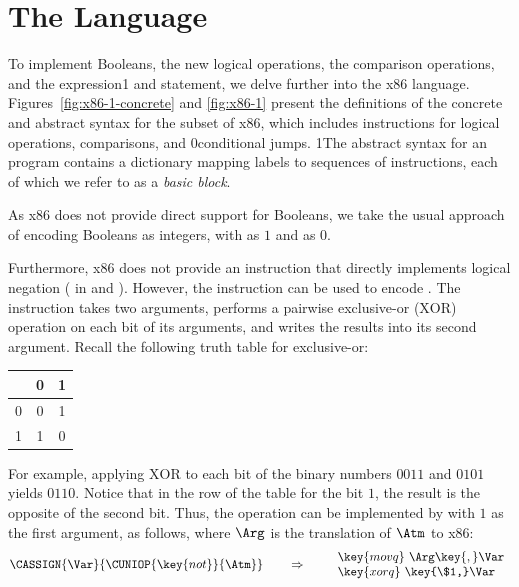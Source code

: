 \documentclass[7x10]{TimesAPriori_MIT}%
\def\racketEd{0}
\def\pythonEd{1}
\def\edition{1}
\newcommand{\racket}[1]{{\if\edition\racketEd{#1}\fi}}
\newcommand{\pythonColor}[0]{}
\newcommand{\python}[1]{{\if\edition\pythonEd\pythonColor #1\fi}}
\numberwithin{theorem}{chapter}
\numberwithin{definition}{chapter}
\numberwithin{equation}{chapter}
\begin{document}
\section{The \LangXIf{} Language}
\label{sec:x86-if}

To implement Booleans, the new logical operations, the
comparison operations, and the  expression\python{ and
  statement}, we delve further into the x86
language. Figures~\ref{fig:x86-1-concrete} and \ref{fig:x86-1} present
the definitions of the concrete and abstract syntax for the \LangXIf{}
subset of x86, which includes instructions for logical operations,
comparisons, and \racket{conditional} jumps.
%
\python{The abstract syntax for an \LangXIf{} program contains a
  dictionary mapping labels to sequences of instructions, each of
  which we refer to as a \emph{basic block}\index{subject}{basic
    block}.}

As x86 does not provide direct support for Booleans, we take the usual
approach of encoding Booleans as integers, with  as $1$ and
 as $0$.

Furthermore, x86 does not provide an instruction that directly
implements logical negation ( in \LangIf{} and \LangCIf{}).
However, the  instruction can be used to encode .
The  instruction takes two arguments, performs a pairwise
exclusive-or ($\mathrm{XOR}$) operation on each bit of its arguments,
and writes the results into its second argument.  Recall the following
truth table for exclusive-or:
\begin{center}
\begin{tabular}{l|cc}
   & 0 & 1 \\ \hline
0  & 0 & 1 \\
1  & 1 & 0
\end{tabular}
\end{center}
For example, applying $\mathrm{XOR}$ to each bit of the binary numbers
$0011$ and $0101$ yields $0110$. Notice that in the row of the table
for the bit $1$, the result is the opposite of the second bit.  Thus,
the  operation can be implemented by  with $1$ as
the first argument, as follows, where $\Arg$ is the translation of
$\Atm$ to x86:
\[
\CASSIGN{\Var}{\CUNIOP{\key{not}}{\Atm}}
\qquad\Rightarrow\qquad
\begin{array}{l}
\key{movq}~ \Arg\key{,} \Var\\
\key{xorq}~ \key{\$1,} \Var
\end{array}
\]
\end{document}
